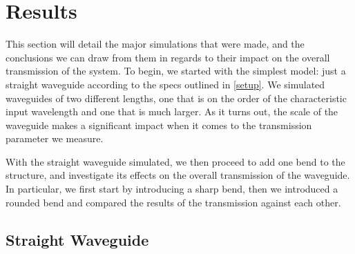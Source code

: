 \chapter{Results}
\label{results}
This section will detail the major simulations that were made, and the conclusions we can draw from them in
regards to their impact on the overall transmission of the system. To begin, we started with the simplest
model: just a straight waveguide according to the specs outlined in \cref{setup}. We simulated waveguides of
two different lengths, one that is on the order of the characteristic input wavelength and one that is much
larger. As it turns out, the scale of the waveguide makes a significant impact when it comes to the
transmission parameter we measure. 

With the straight waveguide simulated, we then proceed to add one bend to the structure, and investigate its
effects on the overall transmission of the waveguide. In particular, we first start by introducing a
sharp bend, then we introduced a rounded bend and compared the results of the transmission against each
other.

\section{Straight Waveguide}

